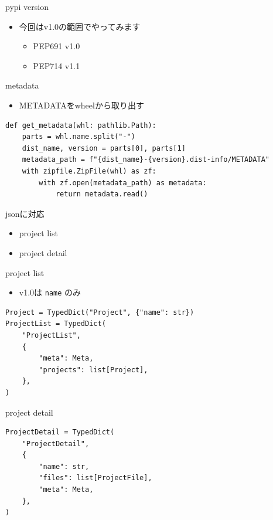 \documentclass[presentation]{beamer}
\begin{document}
\begin{frame}[label={sec:org39861ad}]{pypi version}
\begin{itemize}
\item 今回はv1.0の範囲でやってみます

\begin{itemize}
\item PEP691 v1.0
\item PEP714 v1.1
\end{itemize}
\end{itemize}
\end{frame}

\begin{frame}[label={sec:org47a7336},fragile]{metadata}
 \begin{itemize}
\item METADATAをwheelから取り出す
\end{itemize}
\begin{verbatim}
def get_metadata(whl: pathlib.Path):
    parts = whl.name.split("-")
    dist_name, version = parts[0], parts[1]
    metadata_path = f"{dist_name}-{version}.dist-info/METADATA"
    with zipfile.ZipFile(whl) as zf:
        with zf.open(metadata_path) as metadata:
            return metadata.read()

\end{verbatim}
\end{frame}
\begin{frame}[label={sec:org8ae0e17}]{jsonに対応}
\begin{itemize}
\item project list
\item project detail
\end{itemize}
\end{frame}

\begin{frame}[label={sec:orge7fc8f8},fragile]{project list}
 \begin{itemize}
\item v1.0は \texttt{name} のみ
\end{itemize}

\begin{verbatim}
Project = TypedDict("Project", {"name": str})
ProjectList = TypedDict(
    "ProjectList",
    {
        "meta": Meta,
        "projects": list[Project],
    },
)

\end{verbatim}
\end{frame}

\begin{frame}[label={sec:org1e8a099},fragile]{project detail}
 \begin{verbatim}
ProjectDetail = TypedDict(
    "ProjectDetail",
    {
        "name": str,
        "files": list[ProjectFile],
        "meta": Meta,
    },
)

\end{verbatim}
\end{frame}
\end{document}
